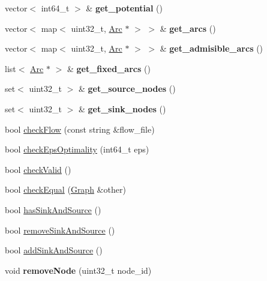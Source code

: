 \begin{DoxyCompactItemize}
\item 
\hypertarget{classflowlessly_1_1Graph_ab433ff1102bc8c98b7465eb99b3e81f8}{vector$<$ int64\-\_\-t $>$ \& {\bfseries get\-\_\-potential} ()}\label{classflowlessly_1_1Graph_ab433ff1102bc8c98b7465eb99b3e81f8}

\item 
\hypertarget{classflowlessly_1_1Graph_a37fe752749b6a35424e2f2f4fa5857e5}{vector$<$ map$<$ uint32\-\_\-t, \hyperlink{classflowlessly_1_1Arc}{\-Arc} $\ast$ $>$ $>$ \& {\bfseries get\-\_\-arcs} ()}\label{classflowlessly_1_1Graph_a37fe752749b6a35424e2f2f4fa5857e5}

\item 
\hypertarget{classflowlessly_1_1Graph_a85c8535e175ce5a190aa14f6c3b57ecc}{vector$<$ map$<$ uint32\-\_\-t, \hyperlink{classflowlessly_1_1Arc}{\-Arc} $\ast$ $>$ $>$ \& {\bfseries get\-\_\-admisible\-\_\-arcs} ()}\label{classflowlessly_1_1Graph_a85c8535e175ce5a190aa14f6c3b57ecc}

\item 
\hypertarget{classflowlessly_1_1Graph_a8d44f00e2c012a1b95b7a313214dde2c}{list$<$ \hyperlink{classflowlessly_1_1Arc}{\-Arc} $\ast$ $>$ \& {\bfseries get\-\_\-fixed\-\_\-arcs} ()}\label{classflowlessly_1_1Graph_a8d44f00e2c012a1b95b7a313214dde2c}

\item 
\hypertarget{classflowlessly_1_1Graph_aa1cb3aed6dd0113962dad5ae04277f67}{set$<$ uint32\-\_\-t $>$ \& {\bfseries get\-\_\-source\-\_\-nodes} ()}\label{classflowlessly_1_1Graph_aa1cb3aed6dd0113962dad5ae04277f67}

\item 
\hypertarget{classflowlessly_1_1Graph_a3e4fcd56f3de5eee55b957f4cbaf80a7}{set$<$ uint32\-\_\-t $>$ \& {\bfseries get\-\_\-sink\-\_\-nodes} ()}\label{classflowlessly_1_1Graph_a3e4fcd56f3de5eee55b957f4cbaf80a7}

\item 
bool \hyperlink{classflowlessly_1_1Graph_aa3da1f87177c687ee1465356f187e238}{check\-Flow} (const string \&flow\-\_\-file)
\item 
bool \hyperlink{classflowlessly_1_1Graph_a3ad531de1b848126c46bbf986b6c2f2b}{check\-Eps\-Optimality} (int64\-\_\-t eps)
\item 
bool \hyperlink{classflowlessly_1_1Graph_ad07412381c17777348eabf31801d7877}{check\-Valid} ()
\item 
bool \hyperlink{classflowlessly_1_1Graph_ad23662b6dc5949274015b2b351208a4f}{check\-Equal} (\hyperlink{classflowlessly_1_1Graph}{\-Graph} \&other)
\item 
bool \hyperlink{classflowlessly_1_1Graph_add8d90cc2601bdab3e623c548d77a84d}{has\-Sink\-And\-Source} ()
\item 
bool \hyperlink{classflowlessly_1_1Graph_a1794e96397b2ae9ea8d6a7bd4a7aa79b}{remove\-Sink\-And\-Source} ()
\item 
bool \hyperlink{classflowlessly_1_1Graph_af250c51c274e3e6abefe5dbf4129e187}{add\-Sink\-And\-Source} ()
\item 
\hypertarget{classflowlessly_1_1Graph_a6d694b81e253af711a36419880255521}{void {\bfseries remove\-Node} (uint32\-\_\-t node\-\_\-id)}\label{classflowlessly_1_1Graph_a6d694b81e253af711a36419880255521}


\end{DoxyCompactItemize}
